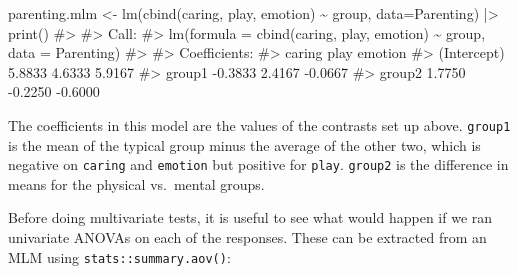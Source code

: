 \documentclass[
  letterpaper,
  10pt,
  krantz2]{krantz}
\makeatletter
\newenvironment{Shaded}{\begin{snugshade}}{\end{snugshade}}
\newcommand{\AttributeTok}[1]{\textcolor[rgb]{0.40,0.45,0.13}{#1}}
\newcommand{\CommentTok}[1]{\textcolor[rgb]{0.37,0.37,0.37}{#1}}
\newcommand{\FunctionTok}[1]{\textcolor[rgb]{0.28,0.35,0.67}{#1}}
\newcommand{\NormalTok}[1]{\textcolor[rgb]{0.00,0.23,0.31}{#1}}
\newcommand{\OtherTok}[1]{\textcolor[rgb]{0.00,0.23,0.31}{#1}}
\newcommand{\SpecialCharTok}[1]{\textcolor[rgb]{0.37,0.37,0.37}{#1}}
\newenvironment{kframe}{%
  \medskip{}
  \setlength{\fboxsep}{.8em}
  \def\at@end@of@kframe{}%
  \ifinner\ifhmode%
  \def\at@end@of@kframe{\end{minipage}}%
  \begin{minipage}{\columnwidth}%
  \fi\fi%
  \def\FrameCommand##1{\hskip\@totalleftmargin \hskip-\fboxsep
  \colorbox{shadecolor}{##1}\hskip-\fboxsep
      \hskip-\linewidth \hskip-\@totalleftmargin \hskip\columnwidth}%
  \MakeFramed {\advance\hsize-\width
    \@totalleftmargin\z@ \linewidth\hsize
    \@setminipage}}%
{\par\unskip\endMakeFramed%
  \at@end@of@kframe}
\renewenvironment{Shaded}{\begin{kframe}}{\end{kframe}}
\makeatother
\begin{document}
\begin{Shaded}
\begin{Highlighting}[]
\NormalTok{parenting.mlm }\OtherTok{\textless{}{-}} \FunctionTok{lm}\NormalTok{(}\FunctionTok{cbind}\NormalTok{(caring, play, emotion) }\SpecialCharTok{\textasciitilde{}}\NormalTok{ group, }
                    \AttributeTok{data=}\NormalTok{Parenting) }\SpecialCharTok{|\textgreater{}} \FunctionTok{print}\NormalTok{()}
\CommentTok{\#\textgreater{} }
\CommentTok{\#\textgreater{} Call:}
\CommentTok{\#\textgreater{} lm(formula = cbind(caring, play, emotion) \textasciitilde{} group, data = Parenting)}
\CommentTok{\#\textgreater{} }
\CommentTok{\#\textgreater{} Coefficients:}
\CommentTok{\#\textgreater{}              caring   play     emotion}
\CommentTok{\#\textgreater{} (Intercept)   5.8833   4.6333   5.9167}
\CommentTok{\#\textgreater{} group1       {-}0.3833   2.4167  {-}0.0667}
\CommentTok{\#\textgreater{} group2        1.7750  {-}0.2250  {-}0.6000}
\end{Highlighting}
\end{Shaded}

The coefficients in this model are the values of the contrasts set up
above. \texttt{group1} is the mean of the typical group minus the
average of the other two, which is negative on \texttt{caring} and
\texttt{emotion} but positive for \texttt{play}. \texttt{group2} is the
difference in means for the physical vs.~mental groups.

Before doing multivariate tests, it is useful to see what would happen
if we ran univariate ANOVAs on each of the responses. These can be
extracted from an MLM using \texttt{stats::summary.aov()}:
\end{document}
